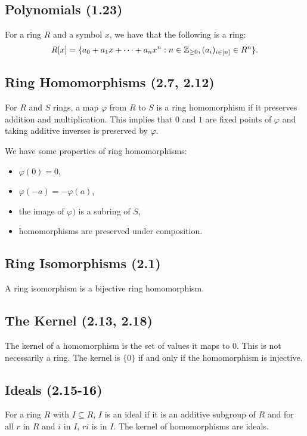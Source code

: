 \subsection{Polynomials (1.23)} \label{1.23}

For a ring $R$ and a symbol $x$, we have that the following is a ring: \begin{align*}
    R[x] = \{a_0 + a_1x + \cdots + a_nx^n : n \in \mathbb{Z}_{\geq 0}, (a_i)_{i \in [n]} \in R^n\}.
\end{align*} 

\subsection{Ring Homomorphisms (2.7, 2.12)} \label{2.7} \label{2.12}

For $R$ and $S$ rings, a map $\varphi$ from $R$ to $S$ is a ring
homomorphism if it preserves addition and multiplication.
This implies that $0$ and $1$ are fixed points of $\varphi$
and taking additive inverses is preserved by $\varphi$.

\newpage
\noindent
We have some properties of ring homomorphisms: \begin{itemize}
    \item $\varphi(0) = 0$,
    \item $\varphi(-a) = -\varphi(a)$,
    \item the image of $\varphi)$ is a subring of $S$,
    \item homomorphisms are preserved under composition.
\end{itemize}

\subsection{Ring Isomorphisms (2.1)} \label{2.1}

A ring isomorphism is a bijective ring homomorphism.

\subsection{The Kernel (2.13, 2.18)} \label{2.13} \label{2.18}

The kernel of a homomorphism is the set of values it maps to $0$.
This is not necessarily a ring. The kernel is $\{0\}$ if and only
if the homomorphism is injective.

\subsection{Ideals (2.15-16)} \label{2.15} \label{2.16}

For a ring $R$ with $I \subseteq R$, $I$ is an ideal if it is an additive
subgroup of $R$ and for all $r$ in $R$ and $i$ in $I$, $ri$ is in $I$.
The kernel of homomorphisms are ideals.

